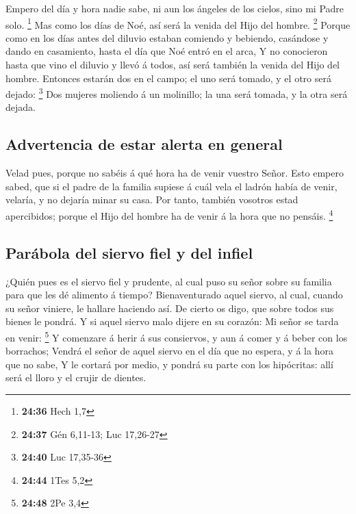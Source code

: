  Empero del día y hora nadie sabe, ni aun los ángeles de
los cielos, sino mi Padre solo. \footnote{\textbf{24:36} Hech 1,7}
 Mas como los días de Noé, así será la venida del Hijo
del hombre. \footnote{\textbf{24:37} Gén 6,11-13; Luc 17,26-27}
 Porque como en los días antes del diluvio estaban
comiendo y bebiendo, casándose y dando en casamiento, hasta el día que
Noé entró en el arca,  Y no conocieron hasta que vino el
diluvio y llevó á todos, así será también la venida del Hijo del hombre.
 Entonces estarán dos en el campo; el uno será tomado, y
el otro será dejado: \footnote{\textbf{24:40} Luc 17,35-36}
 Dos mujeres moliendo á un molinillo; la una será tomada,
y la otra será dejada.

\hypertarget{advertencia-de-estar-alerta-en-general}{%
\subsection{Advertencia de estar alerta en
general}\label{advertencia-de-estar-alerta-en-general}}

 Velad pues, porque no sabéis á qué hora ha de venir
vuestro Señor.  Esto empero sabed, que si el padre de la
familia supiese á cuál vela el ladrón había de venir, velaría, y no
dejaría minar su casa.  Por tanto, también vosotros estad
apercibidos; porque el Hijo del hombre ha de venir á la hora que no
pensáis. \footnote{\textbf{24:44} 1Tes 5,2}

\hypertarget{paruxe1bola-del-siervo-fiel-y-del-infiel}{%
\subsection{Parábola del siervo fiel y del
infiel}\label{paruxe1bola-del-siervo-fiel-y-del-infiel}}

 ¿Quién pues es el siervo fiel y prudente, al cual puso
su señor sobre su familia para que les dé alimento á tiempo?
 Bienaventurado aquel siervo, al cual, cuando su señor
viniere, le hallare haciendo así.  De cierto os digo, que
sobre todos sus bienes le pondrá.  Y si aquel siervo malo
dijere en su corazón: Mi señor se tarda en venir: \footnote{\textbf{24:48}
  2Pe 3,4}  Y comenzare á herir á sus consiervos, y aun á
comer y á beber con los borrachos;  Vendrá el señor de
aquel siervo en el día que no espera, y á la hora que no sabe,
 Y le cortará por medio, y pondrá su parte con los
hipócritas: allí será el lloro y el crujir de dientes.

